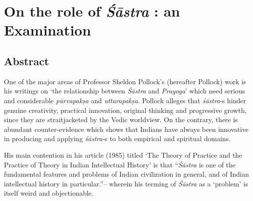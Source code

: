 \chapter{On the role of {\sl\bfseries Śāstra} : an Examination}\label{chapter\thechapter:begin}
\vskip -10pt

\vskip -10pt


\section*{Abstract}

One of the major areas of Professor Sheldon Pollock's (hereafter Pollock) work is his writings on `the relationship between {\it Śāstra} and {\it Prayoga}' which need serious and considerable {\it pūrvapakṣa} and {\it uttarapakṣa}. Pollock alleges that {\it śāstra}-s hinder genuine creativity, practical innovation, original thinking and progressive growth, since they are straitjacketed by the Vedic worldview. On the contrary, there is abundant counter-evidence which shows that Indians have always been innovative in producing and applying {\it śāstra}-s to both empirical and spiritual domains. 

His main contention in his article (1985) titled `The Theory of Practice and the Practice of Theory in Indian Intellectual History' is that ``{\it Śāstra} is one of the fundamental features and problems of Indian civilization in general, and of Indian intellectual history in particular.''-- wherein his terming of {\it Śāstra} as a `problem' is itself weird and objectionable.  

